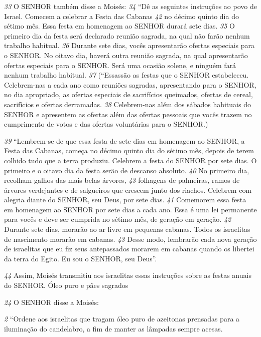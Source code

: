 \textit{\tiny 33}
O SENHOR também disse a Moisés: 
\textit{\tiny 34}
“Dê as seguintes instruções ao povo de
Israel. Comecem a celebrar a Festa das Cabanas
\textit{\tiny 42}
 no décimo quinto dia do sétimo
mês. Essa festa em homenagem ao SENHOR durará sete dias. 
\textit{\tiny 35}
O primeiro dia da
festa será declarado reunião sagrada, na qual não farão nenhum trabalho
habitual. 
\textit{\tiny 36}
Durante sete dias, vocês apresentarão ofertas especiais para o SENHOR.
No oitavo dia, haverá outra reunião sagrada, na qual apresentarão ofertas
especiais para o SENHOR. Será uma ocasião solene, e ninguém fará nenhum
trabalho habitual.
\textit{\tiny 37}
(“Essassão as festas que o SENHOR estabeleceu. Celebrem-nas a cada ano
como reuniões sagradas, apresentando para o SENHOR, no dia apropriado, as
ofertas especiais de sacrifícios queimados, ofertas de cereal, sacrifícios e ofertas
derramadas. 
\textit{\tiny 38}
Celebrem-nas além dos sábados habituais do SENHOR e apresentem
as ofertas além das ofertas pessoais que vocês trazem no cumprimento de votos e
das ofertas voluntárias para o SENHOR.)
   
\textit{\tiny 39}
“Lembrem-se de que essa festa de sete dias em homenagem ao SENHOR, a
Festa das Cabanas, começa no décimo quinto dia do sétimo mês, depois de terem
colhido tudo que a terra produziu. Celebrem a festa do SENHOR por sete dias. O
primeiro e o oitavo dia da festa serão de descanso absoluto. 
\textit{\tiny 40}
No primeiro dia,
recolham galhos das mais belas árvores,
\textit{\tiny 43}
 folhagens de palmeiras, ramos de
árvores verdejantes e de salgueiros que crescem junto dos riachos. Celebrem com
alegria diante do SENHOR, seu Deus, por sete dias. 
\textit{\tiny 41}
Comemorem essa festa em
homenagem ao SENHOR por sete dias a cada ano. Essa é uma lei permanente para
vocês e deve ser cumprida no sétimo mês, de geração em geração. 
\textit{\tiny 42}
Durante sete
dias, morarão ao ar livre em pequenas cabanas. Todos os israelitas de nascimento
morarão em cabanas. 
\textit{\tiny 43}
Desse modo, lembrarão cada nova geração de israelitas
que eu fiz seus antepassados morarem em cabanas quando os libertei da terra do
Egito. Eu sou o SENHOR, seu Deus”.
   
\textit{\tiny 44}
Assim, Moisés transmitiu aos israelitas essas instruções sobre as festas anuais
do SENHOR.
Óleo puro e pães sagrados
   
\textit{\tiny 24}
 O SENHOR disse a Moisés:
 
\textit{\tiny 2} “Ordene aos israelitas que tragam óleo puro de
azeitonas prensadas para a iluminação do candelabro, a fim de manter as
lâmpadas sempre acesas.
 
